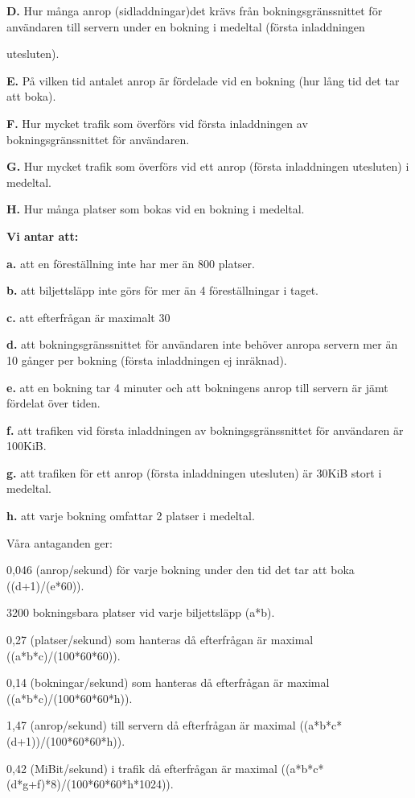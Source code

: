 \documentclass[a4paper, twoside, 11pt, titlepage]{article}
\begin{document}
	\textbf{D.} Hur många anrop (sidladdningar)det krävs från bokningsgränssnittet för användaren till servern under en bokning i medeltal (första inladdningen 

	utesluten).

	\textbf{E.} På vilken tid antalet anrop är fördelade vid en bokning (hur lång tid det tar att boka).

	\textbf{F.} Hur mycket trafik som överförs vid första inladdningen av bokningsgränssnittet för användaren.

	\textbf{G.} Hur mycket trafik som överförs vid ett anrop (första inladdningen utesluten) i medeltal.

	\textbf{H.} Hur många platser som bokas vid en bokning i medeltal.

	\textbf{Vi antar att:}

	\textbf{a.} att en föreställning inte har mer än 800 platser.

	\textbf{b.} att biljettsläpp inte görs för mer än 4 föreställningar i taget.

	\textbf{c.} att efterfrågan är maximalt 30%

	\textbf{d.} att bokningsgränssnittet för användaren inte behöver anropa servern mer än 10 gånger per bokning (första inladdningen ej inräknad).

	\textbf{e.} att en bokning tar 4 minuter och att bokningens anrop till servern är jämt fördelat över tiden. 

	\textbf{f.} att trafiken vid första inladdningen av bokningsgränssnittet för användaren är 100KiB.

	\textbf{g.} att trafiken för ett anrop (första inladdningen utesluten) är 30KiB stort i medeltal. 

	\textbf{h.} att varje bokning omfattar 2 platser i medeltal.

	Våra antaganden ger:

	0,046 (anrop/sekund) för varje bokning under den tid det tar att boka ((d+1)/(e*60)).

	3200 bokningsbara platser vid varje biljettsläpp (a*b).

	0,27 (platser/sekund) som hanteras då efterfrågan är maximal ((a*b*c)/(100*60*60)).

	0,14 (bokningar/sekund) som hanteras då efterfrågan är maximal ((a*b*c)/(100*60*60*h)).

	1,47 (anrop/sekund) till servern då efterfrågan är maximal ((a*b*c*(d+1))/(100*60*60*h)).

	0,42 (MiBit/sekund) i trafik då efterfrågan är maximal ((a*b*c*(d*g+f)*8)/(100*60*60*h*1024)).
\end{document}
